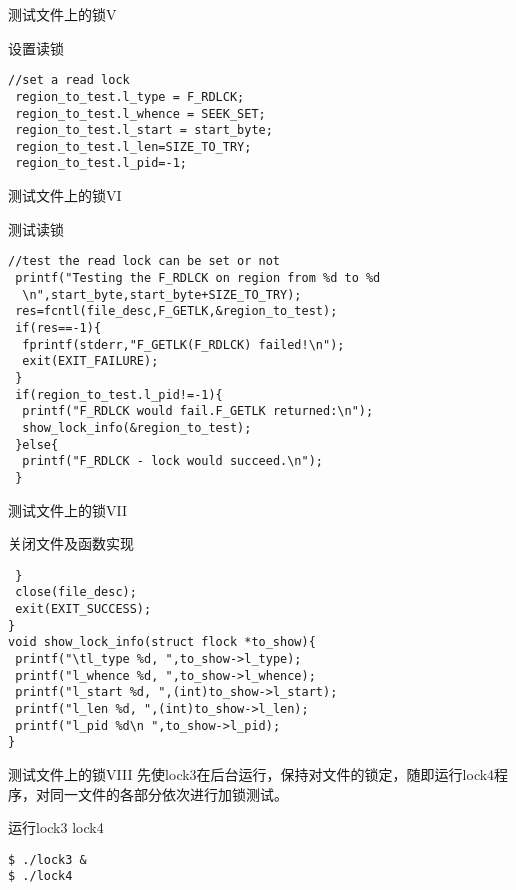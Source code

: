 \documentclass{beamer}
\begin{document}
\begin{frame}[fragile]{测试文件上的锁V}
\begin{block}{设置读锁}
\begin{lstlisting}
//set a read lock
 region_to_test.l_type = F_RDLCK;
 region_to_test.l_whence = SEEK_SET;
 region_to_test.l_start = start_byte;
 region_to_test.l_len=SIZE_TO_TRY;
 region_to_test.l_pid=-1;
\end{lstlisting}
\end{block}
\end{frame}
\begin{frame}[fragile]{测试文件上的锁VI}
\begin{block}{测试读锁}
\begin{lstlisting}
//test the read lock can be set or not
 printf("Testing the F_RDLCK on region from %d to %d
  \n",start_byte,start_byte+SIZE_TO_TRY);	
 res=fcntl(file_desc,F_GETLK,&region_to_test);
 if(res==-1){
  fprintf(stderr,"F_GETLK(F_RDLCK) failed!\n");
  exit(EXIT_FAILURE);
 }
 if(region_to_test.l_pid!=-1){
  printf("F_RDLCK would fail.F_GETLK returned:\n");
  show_lock_info(&region_to_test);
 }else{
  printf("F_RDLCK - lock would succeed.\n");
 }
\end{lstlisting}
\end{block}
\end{frame}
\begin{frame}[fragile]{测试文件上的锁VII}
\begin{block}{关闭文件及函数实现}
\begin{lstlisting}
 }
 close(file_desc);
 exit(EXIT_SUCCESS);
}
void show_lock_info(struct flock *to_show){
 printf("\tl_type %d, ",to_show->l_type);
 printf("l_whence %d, ",to_show->l_whence);
 printf("l_start %d, ",(int)to_show->l_start);
 printf("l_len %d, ",(int)to_show->l_len);
 printf("l_pid %d\n ",to_show->l_pid);
}
\end{lstlisting}
\end{block}
\end{frame}
\begin{frame}[fragile]{测试文件上的锁VIII}
先使lock3在后台运行，保持对文件的锁定，随即运行lock4程序，对同一文件的各部分依次进行加锁测试。
\begin{block}{运行lock3 lock4}
\begin{lstlisting}
$ ./lock3 &
$ ./lock4
\end{lstlisting}
\end{block}
\end{frame}
\end{document}
